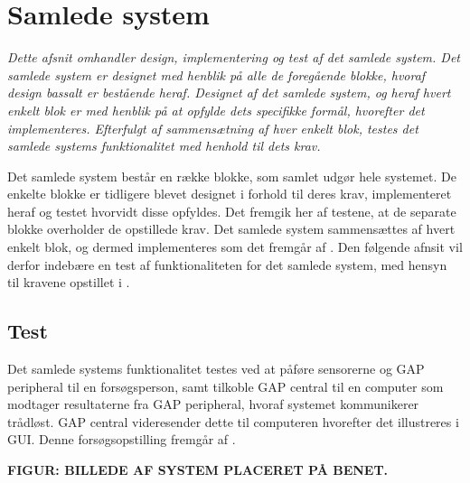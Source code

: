 \section{Samlede system}
\textit{Dette afsnit omhandler design, implementering og test af det samlede system. Det samlede system er designet med henblik på alle de foregående blokke, hvoraf design bassalt er bestående heraf. Designet af det samlede system, og heraf hvert enkelt blok er med henblik på at opfylde dets specifikke formål, hvorefter det implementeres. Efterfulgt af sammensætning af hver enkelt blok, testes det samlede systems funktionalitet med henhold til dets krav.}

Det samlede system består en række blokke, som samlet udgør hele systemet. De enkelte blokke er tidligere blevet designet i forhold til deres krav, implementeret heraf og testet hvorvidt disse opfyldes. Det fremgik her af testene, at de separate blokke overholder de opstillede krav. Det samlede system sammensættes af hvert enkelt blok, og dermed implementeres som det fremgår af . Den følgende afnsit vil derfor indebære en test af funktionaliteten for det samlede system, med hensyn til kravene opstillet i . 

\subsection{Test}
Det samlede systems funktionalitet testes ved at påføre sensorerne og GAP peripheral til en forsøgsperson, samt tilkoble GAP central til en computer som modtager resultaterne fra GAP peripheral, hvoraf systemet kommunikerer trådløst. GAP central videresender dette til computeren hvorefter det illustreres i GUI. Denne forsøgsopstilling fremgår af .

\textbf{FIGUR: BILLEDE AF SYSTEM PLACERET PÅ BENET.}


